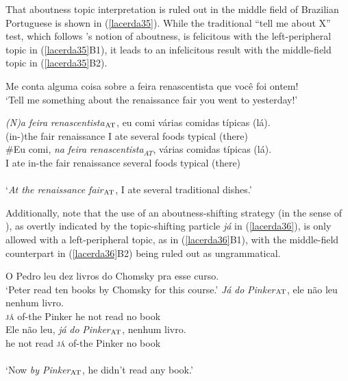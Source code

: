 \documentclass[output=paper]{langscibook}
\begin{document}
That aboutness topic interpretation is ruled out in the middle field of Brazilian Portuguese is shown in (\ref{lacerda35}). While the traditional “tell me about X” test, which follows \citet{Reinhart1981}'s notion of aboutness, is felicitous with the left-peripheral topic in (\ref{lacerda35}B1), it leads to an infelicitous result with the middle-field topic in (\ref{lacerda35}B2).

\begin{exe}
\ex \label{lacerda35}
\begin{xlist}
 \label{lacerda35A}
Me conta alguma coisa sobre a feira renascentista que você foi ontem!\\
‘Tell me something about the renaissance fair you went to yesterday!’

 \label{lacerda35B1}
\gll \emph{(N)a} 	\emph{feira} 	\emph{renascentista}$_{\textnormal{AT}}$, 	eu 	comi 	várias 	comidas 	típicas 	(lá).\\
(in-)the 	fair 	renaissance 	I 	ate 	several 	foods 	typical	(there)\\

 \label{lacerda35B2}
\gll \#Eu 	comi, 	\emph{na} 	\emph{feira} 	\emph{renascentista}$_{AT}$, 	várias 	comidas 	típicas	(lá).\\
I 	ate	in-the 	fair 	renaissance 	several	foods 	typical	(there)\\\\
‘\emph{At the renaissance fair$_{\textnormal{AT}}$}, I ate several traditional dishes.’
\end{xlist}
\end{exe}

Additionally, note that the use of an aboutness-shifting strategy (in the sense of \citealt{BianchiFrascarelli2010}), as overtly indicated by the topic-shifting particle \emph{já} in (\ref{lacerda36}), is only allowed with a left-peripheral topic, as in (\ref{lacerda36}B1), with the middle-field counterpart in (\ref{lacerda36}B2) being ruled out as ungrammatical.

\begin{exe}
\ex \label{lacerda36}
\begin{xlist}
 \label{lacerda36A}
O Pedro leu dez livros do Chomsky pra esse curso.\\
‘Peter read ten books by Chomsky for this course.’
 \label{lacerda36B1}
\gll \emph{Já} 	\emph{do} 	\emph{Pinker}$_{\textnormal{AT}}$, 	ele 	não 	leu 	nenhum 	livro.\\
\textsc{já} 	of-the 	Pinker 	he 	not 	read 	no 	book\\

 \label{lacerda36B2}
\gll *Ele 	não 	leu, 	\emph{já} 	\emph{do} 	\emph{Pinker}$_{\textnormal{AT}}$, 	nenhum 	livro.\\
he 	not 	read 	\textsc{já} 	of-the 	Pinker 	no 	book\\\\
‘Now \emph{by Pinker}$_{\textnormal{AT}}$, he didn’t read any book.’
\end{xlist}
\end{exe}
\end{document}
